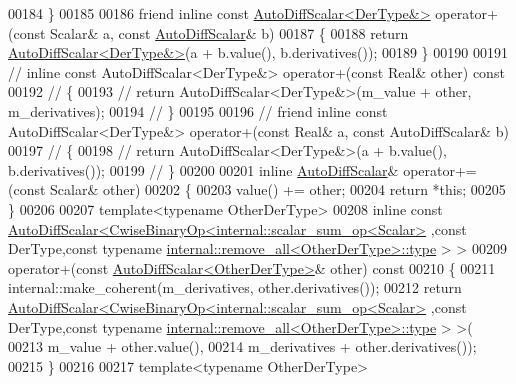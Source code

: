 \begin{DoxyCode}
00184     \}
00185 
00186     \textcolor{keyword}{friend} \textcolor{keyword}{inline} \textcolor{keyword}{const} \hyperlink{class_eigen_1_1_auto_diff_scalar}{AutoDiffScalar<DerType&>} operator+(\textcolor{keyword}{const} Scalar& a, \textcolor{keyword}{const} 
      \hyperlink{class_eigen_1_1_auto_diff_scalar}{AutoDiffScalar}& b)
00187     \{
00188       \textcolor{keywordflow}{return} \hyperlink{class_eigen_1_1_auto_diff_scalar}{AutoDiffScalar<DerType&>}(a + b.value(), b.derivatives());
00189     \}
00190 
00191 \textcolor{comment}{//     inline const AutoDiffScalar<DerType&> operator+(const Real& other) const}
00192 \textcolor{comment}{//     \{}
00193 \textcolor{comment}{//       return AutoDiffScalar<DerType&>(m\_value + other, m\_derivatives);}
00194 \textcolor{comment}{//     \}}
00195 
00196 \textcolor{comment}{//     friend inline const AutoDiffScalar<DerType&> operator+(const Real& a, const AutoDiffScalar& b)}
00197 \textcolor{comment}{//     \{}
00198 \textcolor{comment}{//       return AutoDiffScalar<DerType&>(a + b.value(), b.derivatives());}
00199 \textcolor{comment}{//     \}}
00200 
00201     \textcolor{keyword}{inline} \hyperlink{class_eigen_1_1_auto_diff_scalar}{AutoDiffScalar}& operator+=(\textcolor{keyword}{const} Scalar& other)
00202     \{
00203       value() += other;
00204       \textcolor{keywordflow}{return} *\textcolor{keyword}{this};
00205     \}
00206 
00207     \textcolor{keyword}{template}<\textcolor{keyword}{typename} OtherDerType>
00208     \textcolor{keyword}{inline} \textcolor{keyword}{const} \hyperlink{class_eigen_1_1_auto_diff_scalar}{AutoDiffScalar<CwiseBinaryOp<internal::scalar\_sum\_op<Scalar>}
      ,\textcolor{keyword}{const} DerType,\textcolor{keyword}{const} \textcolor{keyword}{typename} \hyperlink{group___sparse_core___module}{internal::remove\_all<OtherDerType>::type}
      > >
00209     operator+(\textcolor{keyword}{const} \hyperlink{class_eigen_1_1_auto_diff_scalar}{AutoDiffScalar<OtherDerType>}& other)\textcolor{keyword}{ const}
00210 \textcolor{keyword}{    }\{
00211       internal::make\_coherent(m\_derivatives, other.derivatives());
00212       \textcolor{keywordflow}{return} \hyperlink{class_eigen_1_1_auto_diff_scalar}{AutoDiffScalar<CwiseBinaryOp<internal::scalar\_sum\_op<Scalar>}
      ,\textcolor{keyword}{const} DerType,\textcolor{keyword}{const} \textcolor{keyword}{typename} \hyperlink{group___sparse_core___module}{internal::remove\_all<OtherDerType>::type}
      > >(
00213         m\_value + other.value(),
00214         m\_derivatives + other.derivatives());
00215     \}
00216 
00217     \textcolor{keyword}{template}<\textcolor{keyword}{typename} OtherDerType>

\end{DoxyCode}
